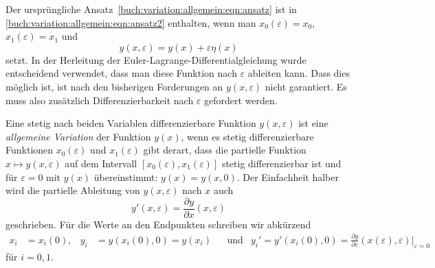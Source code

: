 Der ursprüngliche Ansatz~\eqref{buch:variation:allgemein:eqn:ansatz}
ist in \eqref{buch:variation:allgemein:eqn:ansatz2} enthalten, wenn
man $x_0(\varepsilon)=x_0$, $x_1(\varepsilon)=x_1$ und
\[
y(x,\varepsilon) = y(x) + \varepsilon \eta(x)
\]
setzt.
In der Herleitung der Euler-Lagrange-Differentialgleichung wurde
entscheidend verwendet, dass man diese Funktion nach $\varepsilon$
ableiten kann.
Dass dies möglich ist, ist nach den bisherigen Forderungen an
$y(x,\varepsilon)$ nicht garantiert.
Es muss also zusätzlich Differenzierbarkeit nach $\varepsilon$
gefordert werden.

\begin{definition}
\label{buch:variation:allgemein:def:variation}
Eine stetig nach beiden Variablen differenzierbare Funktion $y(x,\varepsilon)$
ist eine {\em allgemeine Variation} der Funktion $y(x)$, wenn es stetig
differenzierbare Funktionen
$x_0(\varepsilon)$ und $x_1(\varepsilon)$ gibt derart, dass
die partielle Funktion $x\mapsto y(x,\varepsilon)$ auf dem
Intervall $[x_0(\varepsilon),x_1(\varepsilon)]$ stetig differenzierbar
ist und für $\varepsilon=0$ mit $y(x)$ übereinstimmt: $y(x)=y(x,0)$.
Der Einfachheit halber wird die partielle Ableitung von $y(x,\varepsilon)$
nach $x$ auch
\[
y'(x,\varepsilon) = \frac{\partial y}{\partial x}(x,\varepsilon)
\]
geschrieben.
Für die Werte an den Endpunkten schreiben wir abkürzend
\begin{align*}
x_i &= x_i(0),
&
y_i &= y(x_i(0),0) = y(x_i)
&&\text{und}&
y_i'
=
y'(x_i(0),0)
=
\frac{\partial y}{\partial\varepsilon} (x(\varepsilon),\varepsilon)
\bigg|_{\varepsilon=0}
\end{align*}
für $i=0,1$.
\end{definition}

%
%
